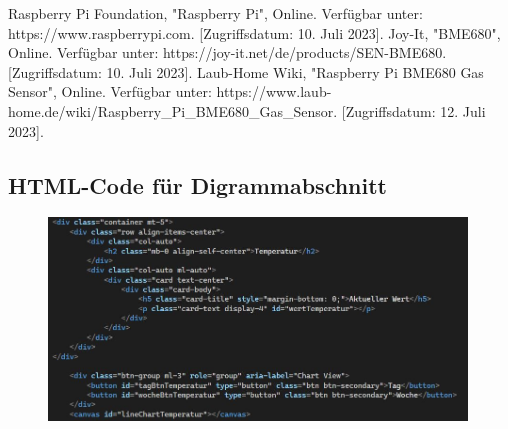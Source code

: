 \documentclass[conference]{IEEEtran}
\begin{document}
\begin{thebibliography}{00}
Raspberry Pi Foundation, "Raspberry Pi", Online. Verfügbar unter: https://www.raspberrypi.com. [Zugriffsdatum: 10. Juli 2023].
Joy-It, "BME680", Online. Verfügbar unter: https://joy-it.net/de/products/SEN-BME680. [Zugriffsdatum: 10. Juli 2023].
Laub-Home Wiki, "Raspberry Pi BME680 Gas Sensor", Online. Verfügbar unter: https://www.laub-home.de/wiki/Raspberry\_Pi\_BME680\_Gas\_Sensor. [Zugriffsdatum: 12. Juli 2023].
\end{thebibliography}
\clearpage
\begin{appendices}
\section{HTML-Code für Digrammabschnitt}
\label{sec:htmlCodeDiagrammAnhang}
\begin{figure}[h]
    \centering
    \includegraphics[width=0.99\textwidth]{fig/htmlcode.JPG}
\end{figure}

\clearpage

\end{appendices}
\end{document}
